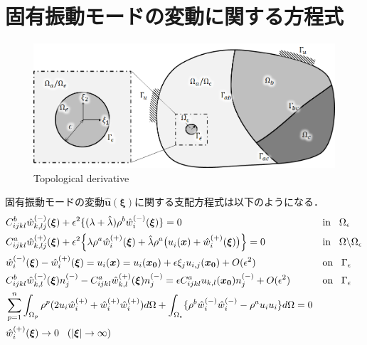 \section{固有振動モードの変動に関する方程式}

\begin{figure}[ht]
	\begin{center}
		\includegraphics[width=13cm]{./figures/TD.png}
		\caption{Topological derivative}
		\label{fig:TD}
	\end{center}
\end{figure}

固有振動モードの変動$\hat{\bm{u}}(\bm{\xi})$に関する支配方程式は以下のようになる．
\begin{align}
&C_{ijkl}^{b} \hat{w}^{(-)}_{k,lj}(\bm{\xi})
+\epsilon^2\{(\lambda+\hat{\lambda})\rho^{b} \hat{w}_{i}^{(-)}(\bm{\xi})\}=0&&\text{in}\hspace{0.3cm}\Omega_{\epsilon}
\label{eq:GovDisturIn}
\\
&C_{ijkl}^{a}\hat{w}^{(+)}_{k,lj}(\bm{\xi})
+\epsilon^2\Bigl \{\lambda\rho^{a} \hat{w}_{i}^{(+)}(\bm{\xi})
+\hat{\lambda}\rho^{a} \bigl(u_{i}^{}(\bm{x})+\hat{w}_{i}^{(+)}(\bm{\xi}) \bigr) \Bigr \}=0
&&\text{in}\hspace{0.3cm}\Omega\backslash\Omega_{\epsilon}
\label{eq:GovDisturOut}
\\
&\hat{w}_{i}^{(-)}(\bm{\xi})-\hat{w}_{i}^{(+)}(\bm{\xi})=u_{i}(\bm{x})=u_{i}(\bm{x_0})+\epsilon \xi_j u_{i,j}(\bm{x_0})+O(\epsilon^2)
&&\text{on}\hspace{0.3cm}\Gamma_{\epsilon}
\label{eq:GovDisturUBC}
\\
&C_{ijkl}^{b}\hat{w}_{k,l}^{(-)}(\bm{\xi})n_{j}^{(-)}
-C_{ijkl}^{a}\hat{w}_{k,l}^{(+)}(\bm{\xi})n_{j}^{(-)}
=\epsilon C_{ijkl}^{a}u_{k,l}(\bm{x_0})n_{j}^{(-)}+O(\epsilon^2)
&&\text{on}\hspace{0.3cm}\Gamma_{\epsilon}
\label{eq:GovDisturSBC}
\\
&\sum_{p=1}^{n}\int_{\Omega_p}\rho^{p}(2u_{i}\hat{w}_{i}^{(+)}+\hat{w}_{i}^{(+)}\hat{w}_{i}^{(+)}) d\Omega
+\int_{\Omega_{\epsilon}}\{\rho^{b}\hat{w}_{i}^{(-)}\hat{w}_{i}^{(-)}-\rho^{a}u_{i}u_{i}\} d\Omega=0
\label{eq:GovDisturNorm}
\\
&\hat{w}_{i}^{(+)}(\bm{\xi})\rightarrow 0 \hspace{0.3cm} (|\bm{\xi}|\rightarrow \infty)
\label{eq:GovDisturInftyBC}
\end{align}

